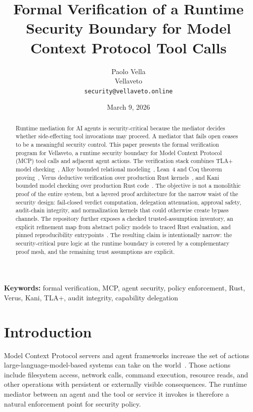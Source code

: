 \documentclass[11pt]{article}
\title{Formal Verification of a Runtime Security Boundary for Model Context Protocol Tool Calls}
\author{Paolo Vella\\Vellaveto\\\texttt{security@vellaveto.online}}
\date{March 9, 2026}
\begin{document}
\maketitle

\begin{abstract}
Runtime mediation for AI agents is security-critical because the mediator
decides whether side-effecting tool invocations may proceed. A mediator that
fails open ceases to be a meaningful security control. This paper presents the
formal verification program for Vellaveto, a runtime security boundary for
Model Context Protocol (MCP) tool calls and adjacent agent actions. The
verification stack combines TLA+ model checking~\cite{lamport94,lamport02},
Alloy bounded relational modeling~\cite{jackson12}, Lean~4 and Coq theorem
proving~\cite{lean4,coq}, Verus deductive verification over production Rust
kernels~\cite{verus}, and Kani bounded model checking over production Rust
code~\cite{kani}. The objective is not a monolithic proof of the entire system,
but a layered proof architecture for the narrow waist of the security design:
fail-closed verdict computation, delegation attenuation, approval safety,
audit-chain integrity, and normalization kernels that could otherwise create
bypass channels. The repository further exposes a checked trusted-assumption
inventory, an explicit refinement map from abstract policy models to traced
Rust evaluation, and pinned reproducibility entrypoints~\cite{vellavetoFormalInventory,vellavetoTCB,vellavetoRefinementMap,vellavetoFormalDocker}. The resulting
claim is intentionally narrow: the security-critical pure logic at the runtime
boundary is covered by a complementary proof mesh, and the remaining trust
assumptions are explicit.
\end{abstract}

\noindent\textbf{Keywords:} formal verification, MCP, agent security, policy
enforcement, Rust, Verus, Kani, TLA+, audit integrity, capability delegation

\section{Introduction}

Model Context Protocol servers and agent frameworks increase the set of actions
large-language-model-based systems can take on the world~\cite{mcpSpec}. Those
actions include filesystem access, network calls, command execution, resource
reads, and other operations with persistent or externally visible consequences.
The runtime mediator between an agent and the tool or service it invokes is
therefore a natural enforcement point for security policy.
\end{document}
